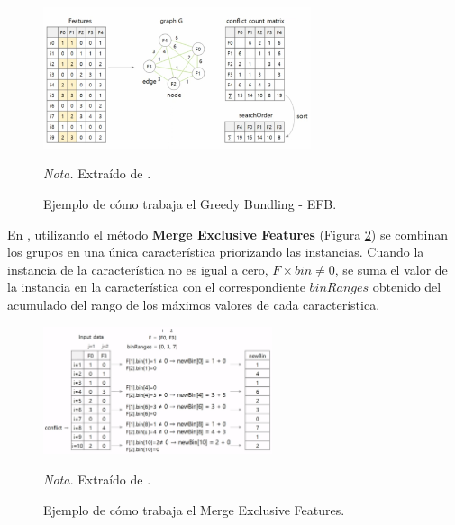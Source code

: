 \begin{figure}[H]
    \centering
    \caption{Ejemplo de cómo trabaja el Greedy Bundling - EFB.}
    \includegraphics[width=0.7\textwidth]{img/4_marco_teorico/efb2.png}
    \label{fig:greddy}
    \begin{flushleft}
        \textit{Nota.} Extraído de \citet{meanxai_mxml-12-03_2023}. 
        \vspace{-\baselineskip}
    \end{flushleft}
\end{figure}

En \citet{meanxai_mxml-12-03_2023}, utilizando el método \textbf{Merge Exclusive Features} (Figura \ref{fig:merge_exclusive_features}) se combinan los grupos en una única característica priorizando las instancias. Cuando la instancia de la característica 
no es igual a cero, $F \times bin \neq 0$, se suma el valor de la instancia en la característica con el correspondiente $binRanges$ obtenido del acumulado del rango de los máximos valores de cada característica. 
\begin{figure}[H]
    \centering
    \caption{Ejemplo de cómo trabaja el Merge Exclusive Features.}
    \includegraphics[width=0.6\textwidth]{img/4_marco_teorico/merge_exclusive_features.png}
    \label{fig:merge_exclusive_features}
    \begin{flushleft}
        \textit{Nota.} Extraído de \citet{meanxai_mxml-12-03_2023}. 
        \vspace{-\baselineskip}
    \end{flushleft}
\end{figure}

